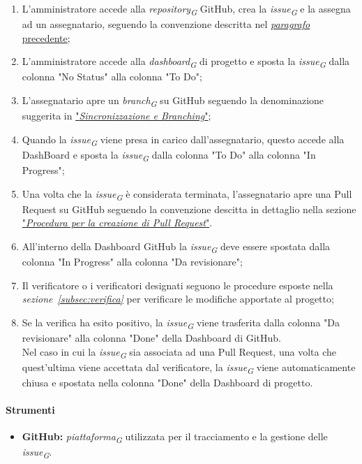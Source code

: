 \begin{enumerate}
		\item L'amministratore accede alla \textit{repository}\textsubscript{\textit{G}} GitHub, crea la \textit{issue}\textsubscript{\textit{G}} e la assegna ad un assegnatario, seguendo la convenzione descritta nel \hyperlink{par:proceduraCreazioneIssue}{\textit{paragrafo} precedente};
		\item L'amministratore accede alla \textit{dashboard}\textsubscript{\textit{G}} di progetto e sposta la \textit{issue}\textsubscript{\textit{G}} dalla colonna "No Status" alla colonna "To Do";
		\item L'assegnatario apre un \textit{branch}\textsubscript{\textit{G}} su GitHub seguendo la denominazione suggerita in \hyperlink{subsubsec:sincronizzazione&branching}{"\textit{Sincronizzazione e Branching}"};
		\item Quando la \textit{issue}\textsubscript{\textit{G}} viene presa in carico dall'assegnatario, questo accede alla DashBoard e sposta la \textit{issue}\textsubscript{\textit{G}} dalla colonna "To Do" alla colonna "In Progress";
		\item Una volta che la \textit{issue}\textsubscript{\textit{G}} è considerata terminata, l'assegnatario apre una Pull Request su GitHub seguendo la convenzione descitta in dettaglio nella sezione \hyperlink{par:creazionePR}{"\textit{Procedura per la creazione di Pull Request}"}.
		\item All'interno della Dashboard GitHub la \textit{issue}\textsubscript{\textit{G}} deve essere spostata dalla colonna "In Progress" alla colonna "Da revisionare";
		\item Il verificatore o i verificatori designati seguono le procedure esposte nella \textit{sezione~\ref{subsec:verifica}} per verificare le modifiche apportate al progetto;
		\item Se la verifica ha esito positivo, la \textit{issue}\textsubscript{\textit{G}} viene trasferita dalla colonna "Da revisionare" alla colonna "Done" della Dashboard di GitHub. \\
		Nel caso in cui la \textit{issue}\textsubscript{\textit{G}} sia associata ad una Pull Request, una volta che quest'ultima viene accettata dal verificatore, la \textit{issue}\textsubscript{\textit{G}} viene automaticamente chiusa e spostata nella colonna "Done" della Dashboard di progetto. 
\end{enumerate}

\paragraph{Strumenti}
\begin{itemize}
	\item \textbf{GitHub:} \textit{piattaforma}\textsubscript{\textit{G}} utilizzata per il tracciamento e la gestione delle \textit{issue}\textsubscript{\textit{G}}.
\end{itemize}

